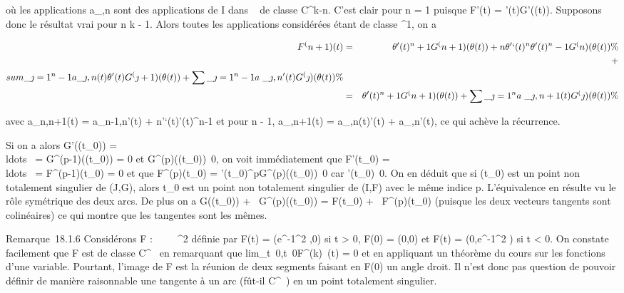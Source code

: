 \documentclass[]{article}
\begin{document}
où les applications a\_\jmath,n sont des applications de I dans ~ de
classe C^k-n. C'est clair pour n = 1 puisque F'(t) =
\theta'(t)G'(\theta(t)). Supposons donc le résultat vrai pour n \leq k - 1. Alors
toutes les applications considérées étant de classe ^1, on a

\begin{align*} F^(n+1)(t)& =&
\theta'(t)^n+1G^(n+1)(\theta(t)) +
n\theta'`(t)^n\theta'(t)^n-1G^(n)(\theta(t)) \%&
\\ & & +\\sum
\_\jmath=1^n-1a\_ \jmath,n(t)\theta'(t)G^(\jmath+1)(\theta(t))
+ \sum \_\jmath=1^n-1a~\_
\jmath,n'(t)G^(\jmath)(\theta(t))\%& \\ &
=& \theta'(t)^n+1G^(n+1)(\theta(t)) +
\sum \_\jmath=1^na~\_
\jmath,n+1(t)G^(\jmath)(\theta(t)) \%& \\
\end{align*}

avec a\_n,n+1(t) = a\_n-1,n\theta'(t) +
n\theta'`(t)\theta'(t)^n-1 et pour \jmath \leq n - 1, a\_\jmath,n+1(t) =
a\_\jmath,n(t)\theta'(t) + a\_,n'(t), ce qui achève la
récurrence.

Si on a alors G'(\theta(t\_0)) =
\\ldots~ =
G^(p-1)(\theta(t\_0)) = 0 et
G^(p)(\theta(t\_0))\neq~0, on voit
immédiatement que F'(t\_0) =
\\ldots~ =
F^(p-1)(t\_0) = 0 et que
F^(p)(t\_0) =
\theta'(t\_0)^pG^(p)(\theta(t\_0))\neq~0
car \theta'(t\_0)\neq~0. On en déduit que si
\theta(t\_0) est un point non totalement singulier de (J,G), alors
t\_0 est un point non totalement singulier de (I,F) avec le même
indice p. L'équivalence en résulte vu le rôle symétrique des deux arcs.
De plus on a G(\theta(t\_0)) + ~G^(p)(\theta(t\_0)) =
F(t\_0) + ~F^(p)(t\_0) (puisque les deux
vecteurs tangents sont colinéaires) ce qui montre que les tangentes sont
les mêmes.

Remarque~18.1.6 Considérons F : ~ \rightarrow~ ~^2 définie par F(t) =
(e^-1\diagupt^2 ,0) si t \textgreater{} 0, F(0) = (0,0)
et F(t) = (0,e^-1\diagupt^2 ) si t \textless{} 0. On
constate facilement que F est de classe C^\infty~ en remarquant que
lim\_t\rightarrow~0,t\neq~0F^(k)~(t)
= 0 et en appliquant un théorème du cours sur les fonctions d'une
variable. Pourtant, l'image de F est la réunion de deux segments faisant
en F(0) un angle droit. Il n'est donc pas question de pouvoir définir de
manière raisonnable une tangente à un arc (fût-il C^\infty~) en un
point totalement singulier.
\end{document}
